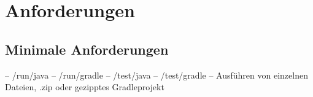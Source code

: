 \chapter{Anforderungen}

\section{Minimale Anforderungen}
-- /run/java
-- /run/gradle
-- /test/java
-- /test/gradle
-- Ausführen von einzelnen Dateien, .zip oder gezipptes Gradleprojekt